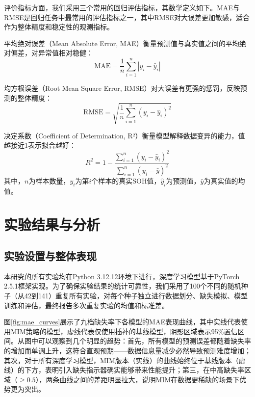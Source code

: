 \documentclass[10pt,a4paper]{ctexart}
\begin{document}
评价指标方面，我们采用三个常用的回归评估指标\cite{jadon2022regressionloss}，其数学定义如下。MAE与RMSE是回归任务中最常用的评估指标之一，其中RMSE对大误差更加敏感，适合作为整体精度和稳定性的观测指标\cite{jadon2022regressionloss}。

平均绝对误差（Mean Absolute Error, MAE）衡量预测值与真实值之间的平均绝对偏差，对异常值相对稳健：
\begin{equation}
    \text{MAE} = \frac{1}{n} \sum_{i=1}^{n} |y_i - \hat{y}_i|
    \label{eq:mae}
\end{equation}

均方根误差（Root Mean Square Error, RMSE）对大误差有更强的惩罚，反映预测的整体精度：
\begin{equation}
    \text{RMSE} = \sqrt{\frac{1}{n} \sum_{i=1}^{n} (y_i - \hat{y}_i)^2}
    \label{eq:rmse}
\end{equation}

决定系数（Coefficient of Determination, R²）衡量模型解释数据变异的能力，值越接近1表示拟合越好：
\begin{equation}
    R^2 = 1 - \frac{\sum_{i=1}^{n} (y_i - \hat{y}_i)^2}{\sum_{i=1}^{n} (y_i - \bar{y})^2}
    \label{eq:r2}
\end{equation}
其中，$n$为样本数量，$y_i$为第$i$个样本的真实SOH值，$\hat{y}_i$为预测值，$\bar{y}$为真实值的均值。

\section{实验结果与分析}\label{sec:results}

\subsection{实验设置与整体表现}

本研究的所有实验均在Python 3.12.12环境下进行，深度学习模型基于PyTorch 2.5.1框架实现。为了确保实验结果的统计可靠性，我们采用了100个不同的随机种子（从42到141）重复所有实验，对每个种子独立进行数据划分、缺失模拟、模型训练和评估，最终报告多次重复实验的均值和标准差。

图\ref{fig:mae_curves}展示了九档缺失率下各模型的MAE表现曲线，其中实线代表使用MIM策略的模型，虚线代表仅使用插补的基线模型，阴影区域表示95\%置信区间。从图中可以观察到几个明显的趋势：首先，所有模型的预测误差都随着缺失率的增加而单调上升，这符合直观预期——数据信息量减少必然导致预测难度增加；其次，对于所有深度学习模型，MIM版本（实线）的曲线始终位于基线版本（虚线）的下方，表明引入缺失指示器确实能够带来性能提升；第三，在中高缺失率区域（$\geq 0.5$），两条曲线之间的差距明显拉大，说明MIM在数据更稀缺的场景下优势更为突出。
\end{document}
